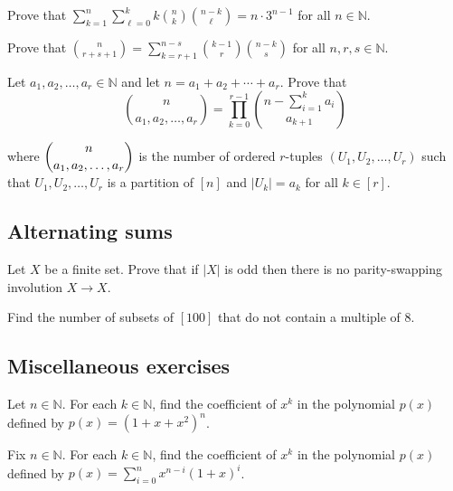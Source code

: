 \begin{chapex}
Prove that $\displaystyle \sum_{k=1}^n \sum_{\ell = 0}^k k \binom{n}{k} \binom{n-k}{\ell} = n \cdot 3^{n-1}$ for all $n \in \mathbb{N}$.
\end{chapex}

\begin{chapex}
Prove that $\displaystyle \binom{n}{r+s+1} = \sum_{k=r+1}^{n-s} \binom{k-1}{r} \binom{n-k}{s}$ for all $n,r,s \in \mathbb{N}$.
\end{chapex}

\begin{chapex}
Let $a_1,a_2,\dots,a_r \in \mathbb{N}$ and let $n = a_1 + a_2 + \cdots + a_r$. Prove that
\[
\binom{n}{a_1,a_2,\dots,a_r} = \prod_{k=0}^{r-1} \binom{n - \sum_{i=1}^k a_i}{a_{k+1}}
\]
\end{chapex}
where $\dbinom{n}{a_1,a_2,\dots,a_r}$ is the number of ordered $r$-tuples $(U_1, U_2, \dots, U_r)$ such that $U_1, U_2, \dots, U_r$ is a partition of $[n]$ and $|U_k| = a_k$ for all $k \in [r]$.

\subsection*{Alternating sums}

\begin{chapex}
Let $X$ be a finite set. Prove that if $|X|$ is odd then there is no parity-swapping involution $X \to X$.
\end{chapex}

\begin{chapex}
Find the number of subsets of $[100]$ that do not contain a multiple of $8$.
\end{chapex}

\subsection*{Miscellaneous exercises}

\begin{chapex}
Let $n \in \mathbb{N}$. For each $k \in \mathbb{N}$, find the coefficient of $x^k$ in the polynomial $p(x)$ defined by $p(x) = (1+x+x^2)^n$.
\end{chapex}

\begin{chapex}
Fix $n \in \mathbb{N}$. For each $k \in \mathbb{N}$, find the coefficient of $x^k$ in the polynomial $p(x)$ defined by $p(x) = \sum_{i=0}^n x^{n-i}(1+x)^i$.
\end{chapex}


